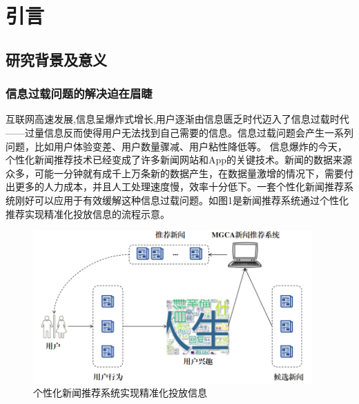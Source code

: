 \documentclass[withoutpreface,bwprint]{cumcmthesis} %
\begin{document}
	\section{引言}
	\subsection{研究背景及意义}
	\subsubsection{ 信息过载问题的解决迫在眉睫} 
	互联网高速发展,信息呈爆炸式增长,用户逐渐由信息匮乏时代迈入了信息过载时代——过量信息反而使得用户无法找到自己需要的信息。信息过载问题会产生一系列问题，比如用户体验变差、用户数量骤减、用户粘性降低等。
	信息爆炸的今天，个性化新闻推荐技术已经变成了许多新闻网站和App的关键技术。新闻的数据来源众多，可能一分钟就有成千上万条新的数据产生，在数据量激增的情况下，需要付出更多的人力成本，并且人工处理速度慢，效率十分低下。一套个性化新闻推荐系统刚好可以应用于有效缓解这种信息过载问题。如图1是新闻推荐系统通过个性化推荐实现精准化投放信息的流程示意。
	\begin{figure}[H]
		\centering
		\includegraphics[width=0.95\textwidth]{2}
		\caption{个性化新闻推荐系统实现精准化投放信息}
		\label{fig:circuit-diagcam}
	\end{figure}
\end{document}
